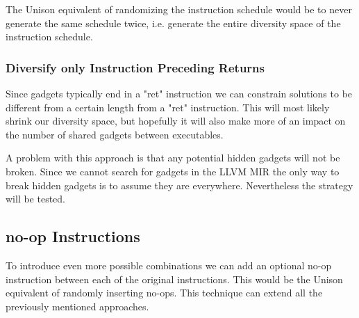 The Unison equivalent of randomizing the instruction schedule would be to never generate
the same schedule twice, i.e. generate the entire diversity space of the instruction
schedule.

\subsubsection{Diversify only Instruction Preceding Returns}

Since gadgets typically end in a "ret" instruction we can constrain solutions to be different
from a certain length from a "ret" instruction. This will most likely shrink our diversity
space, but hopefully it will also make more of an impact on the number of shared gadgets
between executables.

A problem with this approach is that any potential hidden gadgets will not be broken. Since
we cannot search for gadgets in the LLVM MIR the only way to break hidden gadgets is to
assume they are everywhere. Nevertheless the strategy will be tested.

\subsection{no-op Instructions}

To introduce even more possible combinations we can add an optional no-op instruction
between each of the original instructions. This would be the Unison equivalent of randomly
inserting no-ops. This technique can extend all the previously mentioned approaches.
